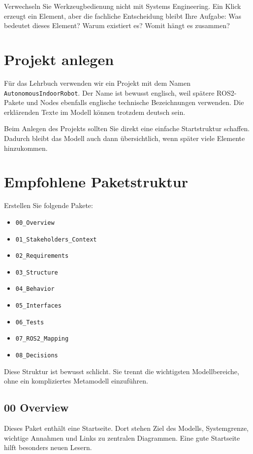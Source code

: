\begin{hinweisbox}
Verwechseln Sie Werkzeugbedienung nicht mit Systems Engineering. Ein Klick erzeugt ein Element, aber die fachliche Entscheidung bleibt Ihre Aufgabe: Was bedeutet dieses Element? Warum existiert es? Womit hängt es zusammen?
\end{hinweisbox}

\section{Projekt anlegen}
Für das Lehrbuch verwenden wir ein Projekt mit dem Namen \texttt{AutonomousIndoorRobot}. Der Name ist bewusst englisch, weil spätere ROS2-Pakete und Nodes ebenfalls englische technische Bezeichnungen verwenden. Die erklärenden Texte im Modell können trotzdem deutsch sein.

Beim Anlegen des Projekts sollten Sie direkt eine einfache Startstruktur schaffen. Dadurch bleibt das Modell auch dann übersichtlich, wenn später viele Elemente hinzukommen.

\section{Empfohlene Paketstruktur}
Erstellen Sie folgende Pakete:

\begin{itemize}
    \item \texttt{00\_Overview}
    \item \texttt{01\_Stakeholders\_Context}
    \item \texttt{02\_Requirements}
    \item \texttt{03\_Structure}
    \item \texttt{04\_Behavior}
    \item \texttt{05\_Interfaces}
    \item \texttt{06\_Tests}
    \item \texttt{07\_ROS2\_Mapping}
    \item \texttt{08\_Decisions}
\end{itemize}

Diese Struktur ist bewusst schlicht. Sie trennt die wichtigsten Modellbereiche, ohne ein kompliziertes Metamodell einzuführen.

\subsection{00 Overview}
Dieses Paket enthält eine Startseite. Dort stehen Ziel des Modells, Systemgrenze, wichtige Annahmen und Links zu zentralen Diagrammen. Eine gute Startseite hilft besonders neuen Lesern.

